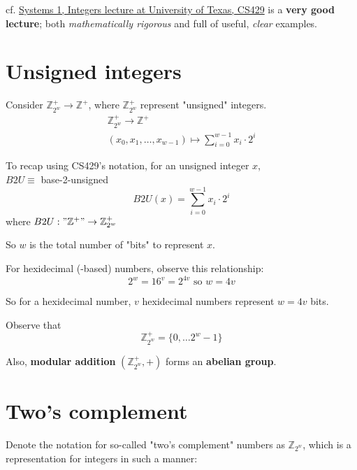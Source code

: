 \documentclass[10pt]{amsart}
\begin{document}
cf. \href{https://www.cs.utexas.edu/users/fussell/courses/cs429h/lectures/Lecture_3-429h.pdf}{Systems 1, Integers lecture at University of Texas, CS429} is a \textbf{very good lecture}; both \emph{mathematically rigorous} and full of useful, \emph{clear} examples.

\section{Unsigned integers}

Consider $\mathbb{Z}^+_{2^w} \to \mathbb{Z}^+$, where $\mathbb{Z}^+_{2^w}$ represent "unsigned" integers. 
\begin{equation}
\begin{gathered}
\mathbb{Z}^+_{2^w} \to \mathbb{Z}^+ \\ 
(x_0, x_1 , \dots , x_{w-1}) \mapsto \sum_{i=0}^{w-1} x_i \cdot 2^i 
\end{gathered}
\end{equation}

To recap using CS429's notation, for an unsigned integer $x$, \\
$B2U \equiv $ base-2-unsigned \\
\[
B2U(x) = \sum_{i=0}^{w-1} x_i \cdot 2^i 
\]
where $B2U : "\mathbb{Z}^+" \to \mathbb{Z}^+_{2^w}$

So $w$ is the total number of "bits" to represent $x$.



For hexidecimal (-based) numbers, observe this relationship: 
\begin{equation}
2^w = 16^v = 2^{4v} \text{ so } w =4v
\end{equation}

So for a hexidecimal number, $v$ hexidecimal numbers represent $w=4v$ bits. 

Observe that 
\begin{equation}
\mathbb{Z}^+_{2^w} = \lbrace 0 , \dots 2^w - 1 \rbrace 
\end{equation}

Also, \textbf{modular addition} $(\mathbb{Z}^+_{2^w}, +)$ forms an \textbf{abelian group}.

\section{Two's complement}

Denote the notation for so-called "two's complement" numbers as $\mathbb{Z}_{2^w}$, which is a representation for integers in such a manner:
\end{document}
